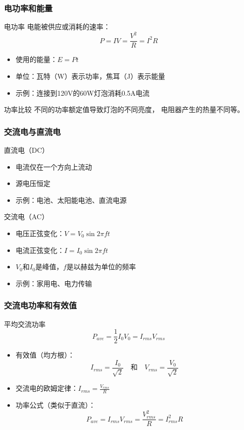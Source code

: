 \documentclass{beamer}
\begin{document}
\begin{frame}
    \frametitle{电功率和能量}
    \begin{block}{电功率}
        电能被供应或消耗的速率：
        \[ P = IV = \frac{V^2}{R} = I^2R \]
    \end{block}
    \begin{itemize}
        \item 使用的能量：$E = Pt$
        \item 单位：瓦特（W）表示功率，焦耳（J）表示能量
        \item 示例：连接到120V的60W灯泡消耗0.5A电流
    \end{itemize}
    \vspace{0.5cm}
    \begin{alertblock}{功率比较}
        不同的功率额定值导致灯泡的不同亮度，
        电阻器产生的热量不同等。
    \end{alertblock}
\end{frame}

\begin{frame}
    \frametitle{交流电与直流电}
    \begin{block}{直流电（DC）}
        \begin{itemize}
            \item 电流仅在一个方向上流动
            \item 源电压恒定
            \item 示例：电池、太阳能电池、直流电源
        \end{itemize}
    \end{block}
    \begin{block}{交流电（AC）}
        \begin{itemize}
            \item 电压正弦变化：$V = V_0 \sin 2\pi ft$
            \item 电流正弦变化：$I = I_0 \sin 2\pi ft$
            \item $V_0$和$I_0$是峰值，$f$是以赫兹为单位的频率
            \item 示例：家用电、电力传输
        \end{itemize}
    \end{block}
\end{frame}

\begin{frame}
    \frametitle{交流电功率和有效值}
    \begin{block}{平均交流功率}
        \[ P_{ave} = \frac{1}{2}I_0V_0 = I_{rms}V_{rms} \]
    \end{block}
    \begin{itemize}
        \item 有效值（均方根）：
        \[ I_{rms} = \frac{I_0}{\sqrt{2}} \quad \text{和} \quad V_{rms} = \frac{V_0}{\sqrt{2}} \]
        \item 交流电的欧姆定律：$I_{rms} = \frac{V_{rms}}{R}$
        \item 功率公式（类似于直流）：
        \[ P_{ave} = I_{rms}V_{rms} = \frac{V_{rms}^2}{R} = I_{rms}^2R \]
    \end{itemize}
\end{frame}
\end{document}
